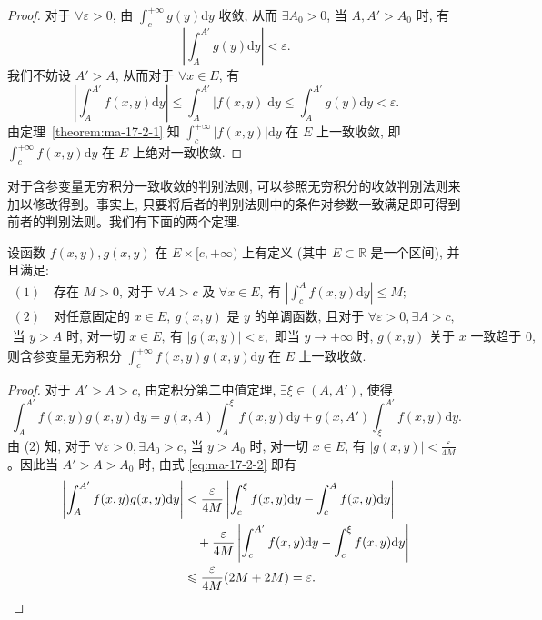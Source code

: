 \begin{proof}
对于 $\forall\varepsilon>0$, 由 $\int_c^{+\infty}g(y)\mathrm dy$ 收敛, 从而 $\exists A_0>0$, 当 $A,A'>A_0$ 时, 有
\[
  \left|\int_A^{A'}g(y)\mathrm dy\right|<\varepsilon.
\]
我们不妨设 $A'>A$, 从而对于 $\forall x\in E$, 有
\[
  \left|\int_A^{A'}f(x,y)\mathrm dy\right|
  \leqslant\int_A^{A'}|f(x,y)|\mathrm dy
  \leqslant\int_A^{A'}g(y)\mathrm dy<\varepsilon.
\]
由定理~\ref{theorem:ma-17-2-1} 知 $\int_c^{+\infty}|f(x,y)|\mathrm dy$ 在 $E$ 上一致收敛, 即 $\int_c^{+\infty}f(x,y)\mathrm dy$ 在 $E$ 上绝对一致收敛.
\end{proof}


对于含参变量无穷积分一致收敛的判别法则, 可以参照无穷积分的收敛判别法则来加以修改得到。事实上, 只要将后者的判别法则中的条件对参数一致满足即可得到前者的判别法则。我们有下面的两个定理.

\begin{theorem}[{狄利克雷判别法}]\label{theorem:ma-17-2-3}
设函数 $f(x,y),g(x,y)$ 在 $E\times[c,+\infty)$ 上有定义 (其中 $E\subset\mathbb R$ 是一个区间), 并且满足:
\[
\begin{gathered}
  (1)\quad \text{存在 } M>0,\ \text{对于 } \forall A>c \text{ 及 } \forall x\in E,\ \text{有 }
  \left|\int_c^A f(x,y)\mathrm dy\right|\leqslant M;\\
  (2)\quad \text{对任意固定的 } x\in E,\ g(x,y) \text{ 是 } y \text{ 的单调函数, 且对于 } \forall\varepsilon>0,\exists A>c,\\
  \text{当 } y>A \text{ 时, 对一切 } x\in E,\ \text{有 } |g(x,y)|<\varepsilon,
  \text{ 即当 } y\to+\infty \text{ 时, } g(x,y) \text{ 关于 } x \text{ 一致趋于 } 0,
\end{gathered}
\]
则含参变量无穷积分 $\int_c^{+\infty}f(x,y)g(x,y)\mathrm dy$ 在 $E$ 上一致收敛.
\end{theorem}


\begin{proof}
对于 $A'>A>c$, 由定积分第二中值定理, $\exists\xi\in(A,A')$, 使得
\begin{equation}
  \int_A^{A'}f(x,y)g(x,y)\mathrm dy
  =
  g(x,A)\int_A^\xi f(x,y)\mathrm dy
  +g(x,A')\int_\xi^{A'}f(x,y)\mathrm dy.
  \label{eq:ma-17-2-2}
\end{equation}
由 (2) 知, 对于 $\forall\varepsilon>0,\exists A_0>c$, 当 $y>A_0$ 时, 对一切 $x\in E$, 有 $|g(x,y)|<\frac{\varepsilon}{4M}$。因此当 $A'>A>A_0$ 时, 由式 \eqref{eq:ma-17-2-2} 即有
\[
\begin{aligned}
  \left|\int_A^{A'}f(x,y)g(x,y)\mathrm dy\right|
  &<\frac{\varepsilon}{4M}\left|\int_c^\xi f(x,y)\mathrm dy-\int_c^A f(x,y)\mathrm dy\right|\\
  &\quad+\frac{\varepsilon}{4M}\left|\int_c^{A'}f(x,y)\mathrm dy-\int_c^\xi f(x,y)\mathrm dy\right|\\
  &\leqslant\frac{\varepsilon}{4M}(2M+2M)=\varepsilon.
\end{aligned}
\qedhere
\]
\end{proof}


